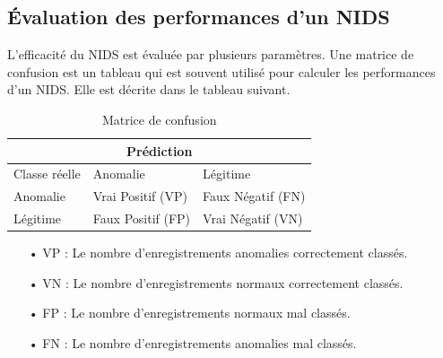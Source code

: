 \subsection{Évaluation des performances d'un NIDS}
\label{evaluation}
L'efficacité du NIDS est évaluée par plusieurs paramètres. Une matrice de confusion est un tableau qui est souvent utilisé pour calculer les performances d'un NIDS. Elle est décrite dans le tableau suivant.
\begin{table}[h]
	\begin{center}
		\begin{tabular}{  | m{4cm} | m{4cm} | m{4cm} | }
			\multicolumn{3}{c}{Prédiction}\\
			\hline
			Classe réelle  & Anomalie & Légitime\\
			\hline
			Anomalie & Vrai Positif (VP) & Faux Négatif (FN)\\
			\hline
			Légitime & Faux Positif (FP) & Vrai Négatif (VN)\\
			\hline
		\end{tabular}
		\caption{Matrice de confusion}
	\end{center}
	\label{table:NIDS_Evaluation}
\end{table}

\begin{itemize}
	\item[• VP] : Le nombre d’enregistrements anomalies correctement classés.\\
	\item[• VN] : Le nombre d’enregistrements normaux correctement classés.\\
	\item[• FP] : Le nombre d’enregistrements normaux mal classés.\\
	\item[• FN] : Le nombre d’enregistrements anomalies mal classés.\\ 
\end{itemize}

